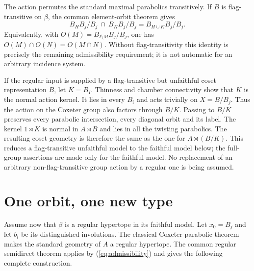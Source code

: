 The action permutes the standard maximal parabolics transitively. If $B$ is flag-transitive on $\beta$, the common element-orbit theorem gives
\begin{equation}\label{eq:admissibility}
B_HB_j/B_j\ \cap\ B_KB_j/B_j=B_{H\cup K}B_j/B_j.
\end{equation}
Equivalently, with $O(M)=B_{I\setminus M}B_j/B_j$, one has $O(M)\cap O(N)=O(M\cap N)$. Without flag-transitivity this identity is precisely the remaining admissibility requirement; it is not automatic for an arbitrary incidence system.

If the regular input is supplied by a flag-transitive but unfaithful coset representation $B$, let $K=B_I$. Thinness and chamber connectivity show that $K$ is the normal action kernel. It lies in every $B_i$ and acts trivially on $X=B/B_j$. Thus the action on the Coxeter group also factors through $B/K$. Passing to $B/K$ preserves every parabolic intersection, every diagonal orbit and its label. The kernel $1\rtimes K$ is normal in $A\rtimes B$ and lies in all the twisting parabolics. The resulting coset geometry is therefore the same as the one for $A\rtimes(B/K)$. This reduces a flag-transitive unfaithful model to the faithful model below; the full-group assertions are made only for the faithful model. No replacement of an arbitrary non-flag-transitive group action by a regular one is being assumed.

\section{One orbit, one new type}
Assume now that $\beta$ is a regular hypertope in its faithful model. Let $x_0=B_j$ and let $b_i$ be its distinguished involutions. The classical Coxeter parabolic theorem makes the standard geometry of $A$ a regular hypertope. The common regular semidirect theorem applies by (\ref{eq:admissibility}) and gives the following complete construction.

